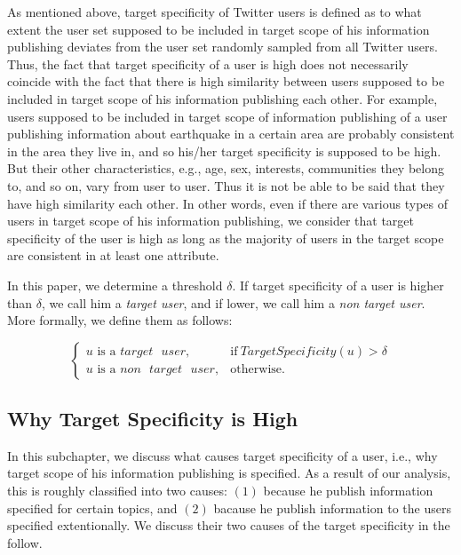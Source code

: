As mentioned above, target specificity of Twitter users is defined
as to what extent the user set supposed to be included in target scope
of his information publishing deviates from the user set randomly
sampled from all Twitter users.  Thus, the fact that target
specificity of a user is high does not necessarily coincide with the
fact that there is high similarity between users supposed to
be included in target scope of his information publishing each
other.  For example, users supposed to be included in target scope of
information publishing of a user publishing information about
earthquake in a certain area are probably consistent in the area they live in,
and so his/her target specificity is supposed to be high.  But their
other characteristics, e.g., age, sex, interests, communities they
belong to, and so on, vary from user to user.  Thus it is not be able to
be said that they have high similarity each other.  In other words, even
if there are various types of users in target scope of his
information publishing, we consider that target specificity of the
user is high as long as the majority of users in the target scope are
consistent in at least one attribute.

In this paper, we determine a threshold $\delta$. If target
specificity of a user is higher than $\delta$, we call him a
\emph{target user}, and if lower, we call him a \emph{non target
user}.  More formally, we define them as follows:

\vspace{-1ex}
\[
  \begin{cases}
   u\mbox{ is a } target\mbox{ }user, & \mbox{if}\
   \mathit{TargetSpecificity}(u) > \delta \\
   u\mbox{ is a }non\mbox{ }target\mbox{ }user, & \mbox{otherwise}.
  \end{cases}
\]
\vspace{-2ex}

\subsection{Why Target Specificity is High}
\label{subsec:The Causes}

In this subchapter, we discuss what causes target specificity of a
user, i.e., why target scope of his information publishing is
specified.  As a result of our analysis, this is roughly classified into
two causes: $(1)$ because he publish information specified for certain
topics, and $(2)$ bacause he publish information to the users
specified extentionally.  We discuss their two causes of the target
specificity in the follow.

